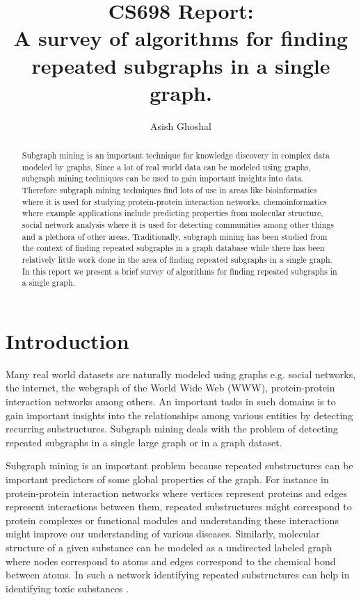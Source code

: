 \documentclass{article}      %
\title{CS698 Report: \\ A survey of algorithms for finding repeated subgraphs in a single graph.}
\author{Asish Ghoshal}
\begin{document}
 

\maketitle      

\begin{abstract}
Subgraph mining is an important technique for knowledge discovery in complex data modeled by graphs. Since 
a lot of real world data can be modeled using graphs, subgraph mining techniques can be used to gain important insights into data.
Therefore subgraph mining techniques find lots of use in areas like bioinformatics
where it is used for studying protein-protein interaction networks, chemoinformatics where example applications include
predicting properties from molecular structure, social network analysis where it is used for detecting communities among other things and
a plethora of other areas. Traditionally, subgraph mining has been studied from the context of finding repeated subgraphs in a graph database
while there has been relatively little work done in the area of finding repeated subgraphs in a single graph. 
In this report we present a brief survey of algorithms for finding repeated subgraphs in a single graph.
\end{abstract}

\section{Introduction}
Many real world datasets are naturally modeled using graphs e.g. social networks, the internet, the webgraph of the World Wide Web (WWW),
protein-protein interaction networks among others. An important tasks in such domains is to gain important insights into the relationships
among various entities by detecting recurring substructures. Subgraph mining deals with the problem of detecting repeated subgraphs in
a single large graph or in a graph dataset.

Subgraph mining is an important problem because repeated substructures can be important predictors of some global properties of the graph.
For instance in protein-protein interaction networks where vertices represent proteins and edges represent interactions between them,
repeated substructures might correspond to protein complexes or functional modules \cite{Wang2010} and understanding these interactions might improve
our understanding of various diseases. Similarly, molecular structure of a given substance can be modeled as a undirected labeled graph where
nodes correspond to atoms and edges correspond to the chemical bond between atoms. In such a network identifying repeated substructures can
help in identifying toxic substances \cite{Srinivasan1997}. 
\end{document}
